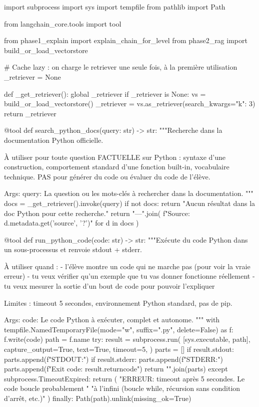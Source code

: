 \documentclass[11pt,a4paper]{article}
\begin{document}
\begin{pythoncode}
import subprocess
import sys
import tempfile
from pathlib import Path

from langchain_core.tools import tool

from phase1_explain import explain_chain_for_level
from phase2_rag import build_or_load_vectorstore


# Cache lazy : on charge le retriever une seule fois, à la première utilisation
_retriever = None

def _get_retriever():
    global _retriever
    if _retriever is None:
        vs = build_or_load_vectorstore()
        _retriever = vs.as_retriever(search_kwargs={"k": 3})
    return _retriever


@tool
def search_python_docs(query: str) -> str:
    """Recherche dans la documentation Python officielle.

    À utiliser pour toute question FACTUELLE sur Python : syntaxe d'une
    construction, comportement standard d'une fonction built-in, vocabulaire
    technique. PAS pour générer du code ou évaluer du code de l'élève.

    Args:
        query: La question ou les mots-clés à rechercher dans la documentation.
    """
    docs = _get_retriever().invoke(query)
    if not docs:
        return "Aucun résultat dans la doc Python pour cette recherche."
    return "\n\n---\n\n".join(
        f"Source: {d.metadata.get('source', '?')}"
        for d in docs
    )


@tool
def run_python_code(code: str) -> str:
    """Exécute du code Python dans un sous-processus et renvoie stdout + stderr.

    À utiliser quand :
      - l'élève montre un code qui ne marche pas (pour voir la vraie erreur)
      - tu veux vérifier qu'un exemple que tu vas donner fonctionne réellement
      - tu veux mesurer la sortie d'un bout de code pour pouvoir l'expliquer

    Limites : timeout 5 secondes, environnement Python standard, pas de pip.

    Args:
        code: Le code Python à exécuter, complet et autonome.
    """
    with tempfile.NamedTemporaryFile(mode="w", suffix=".py", delete=False) as f:
        f.write(code)
        path = f.name
    try:
        result = subprocess.run(
            [sys.executable, path],
            capture_output=True, text=True, timeout=5,
        )
        parts = []
        if result.stdout:
            parts.append(f"STDOUT:")
        if result.stderr:
            parts.append(f"STDERR:")
        parts.append(f"Exit code: {result.returncode}")
        return "\n\n".join(parts)
    except subprocess.TimeoutExpired:
        return (
            "ERREUR: timeout après 5 secondes. Le code boucle probablement "
            "à l'infini (boucle while, récursion sans condition d'arrêt, etc.)"
        )
    finally:
        Path(path).unlink(missing_ok=True)



\end{pythoncode}
\end{document}
